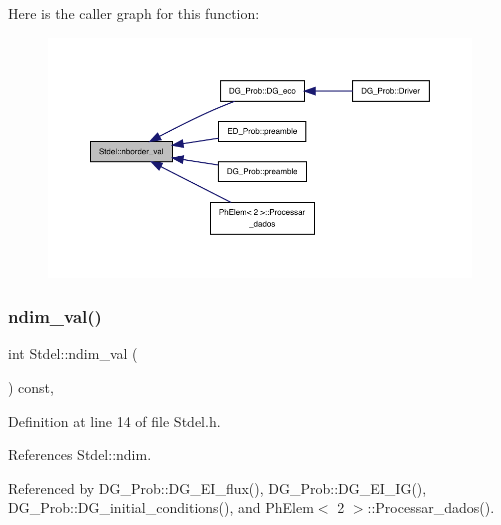 Here is the caller graph for this function\+:
\nopagebreak
\begin{figure}[H]
\begin{center}
\leavevmode
\includegraphics[width=350pt]{classStdel_aac8e97661e46c48fafa91f13caa03a9f_icgraph}
\end{center}
\end{figure}
\mbox{\label{classStdel_a383df930bee8dc298d7d412b3b632ebb}} 
\subsubsection{\texorpdfstring{ndim\+\_\+val()}{ndim\_val()}}
{\footnotesize\ttfamily int Stdel\+::ndim\+\_\+val (\begin{DoxyParamCaption}{ }\end{DoxyParamCaption}) const\hspace{0.3cm}{\ttfamily [inline]}, {\ttfamily [inherited]}}



Definition at line 14 of file Stdel.\+h.



References Stdel\+::ndim.



Referenced by D\+G\+\_\+\+Prob\+::\+D\+G\+\_\+\+E\+I\+\_\+flux(), D\+G\+\_\+\+Prob\+::\+D\+G\+\_\+\+E\+I\+\_\+\+I\+G(), D\+G\+\_\+\+Prob\+::\+D\+G\+\_\+initial\+\_\+conditions(), and Ph\+Elem$<$ 2 $>$\+::\+Processar\+\_\+dados().

